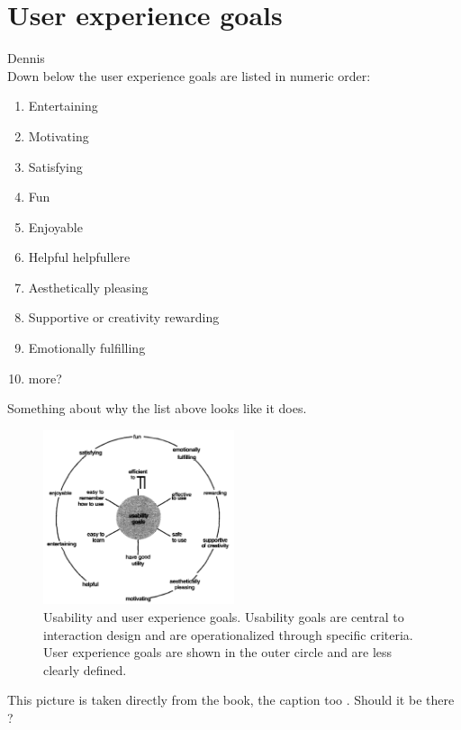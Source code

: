 \section{User experience goals}Dennis\\
Down below the user experience goals are listed in numeric order:
\begin{enumerate}
	\item Entertaining
	\item Motivating
	\item Satisfying
	\item Fun
	\item Enjoyable
	\item Helpful helpfullere 
	\item Aesthetically pleasing
	\item Supportive or creativity rewarding
	\item Emotionally fulfilling
	\item more?
\end{enumerate}
Something about why the list above looks like it does.

\begin{figure}[h!]		%
 \begin{centering}
  \includegraphics[width=0.5\textwidth]{images/usability_goals_diagram.png}
   \caption{Usability and user experience goals. Usability goals are central to
  			interaction design and are operationalized through specific criteria. 
  			User experience goals are shown in the outer circle and are less clearly defined.}
 \end{centering}
\end{figure}

This picture is taken directly from the book, the caption too . Should it be
there ?

